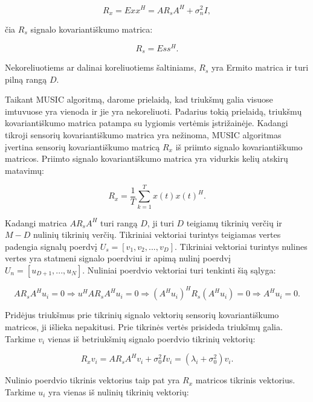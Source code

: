 \documentclass[main.tex]{subfiles}
\begin{document}
\begin{equation}
    R_x = E{xx^H} = AR_sA^H + \sigma^2_n I,
\end{equation}

\noindent čia $R_s$ signalo kovariantiškumo matrica:

\begin{equation}
    R_s=E{ss^H}.
\end{equation}

\noindent Nekoreliuotiems ar dalinai koreliuotiems šaltiniams, $R_s$ yra Ermito matrica
ir turi pilną rangą $D$.

Taikant MUSIC algoritmą, darome prielaidą, kad triukšmų galia visuose imtuvuose yra vienoda
ir jie yra nekoreliuoti. Padarius tokią prielaidą, triukšmų kovariantiškumo matrica patampa
su lygiomis vertėmis įstrižainėje. Kadangi tikroji sensorių kovariantiškumo matrica
yra nežinoma, MUSIC algoritmas įvertina sensorių kovariantiškumo matricą $R_x$
iš priimto signalo kovariantiškumo matricos. Priimto signalo kovariantiškumo matrica
yra vidurkis kelių atskirų matavimų:

\begin{equation}
    R_x = \frac{1}{T} \sum^T_{k=1} {x(t)x(t)^H}.
\end{equation}

Kadangi matrica $AR_sA^H$ turi rangą $D$, ji turi $D$ teigiamų tikrinių verčių ir
$M-D$ nulinių tikrinių verčių.
Tikriniai vektoriai turintys teigiamas vertes padengia signalų poerdvį $U_s=[v_1,v_2,...,v_D]$.
Tikriniai vektoriai turintys nulines vertes yra statmeni signalo poerdviui ir apimą
nulinį poerdvį $U_n=[u_{D+1},...,u_N]$. Nuliniai poerdvio vektoriai turi tenkinti
šią sąlyga:

\begin{equation}
    AR_sA^Hu_i=0 \Rightarrow u^HAR_sA^Hu_i = 0 \Rightarrow (A^Hu_i)^HR_s(A^Hu_i)=0 \Rightarrow A^Hu_i=0.
\end{equation}

Pridėjus triukšmus prie tikrinių signalo vektorių sensorių kovariantiškumo matricos, ji
išlieka nepakitusi. Prie tikrinės vertės prisideda triukšmų galia. Tarkime
$v_i$ vienas iš betriukšmių signalo poerdvio tikrinių vektorių:

\begin{equation}
    R_xv_i=AR_sA^Hv_i+\sigma^2_0Iv_i = (\lambda_i + \sigma^2_0)v_i.
\end{equation}

\noindent Nulinio poerdvio tikrinis vektorius taip pat yra $R_x$ matricos tikrinis
vektorius. Tarkime $u_i$ yra vienas iš nulinių tikrinių vektorių:
\end{document}
